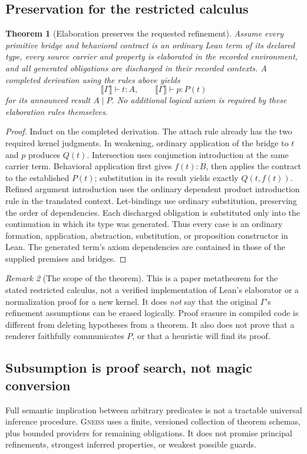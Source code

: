 \documentclass[11pt,letterpaper]{article}
\newcommand{\Gneiss}{\textsc{Gneiss}}
\newcommand{\sem}[1]{\llbracket #1\rrbracket}
\newtheorem{theorem}{Theorem}[section]
\theoremstyle{definition}
\theoremstyle{remark}
\newtheorem{remark}[theorem]{Remark}
\begin{document}
\subsection{Preservation for the restricted calculus}
\begin{theorem}[Elaboration preserves the requested refinement]\label{thm:preservation}
Assume every primitive bridge and behavioral contract is an ordinary Lean term
of its declared type, every source carrier and property is elaborated in the
recorded environment, and all generated obligations are discharged in their
recorded contexts. A completed derivation using the rules above yields
\[
 \sem\Gamma\vdash t:A,
 \qquad \sem\Gamma\vdash p:P(t)
\]
for its announced result $A\mid P$. No additional logical axiom is required by
these elaboration rules themselves.
\end{theorem}
\begin{proof}
Induct on the completed derivation. The attach rule already has the two required
kernel judgments. In weakening, ordinary application of the bridge to $t$ and
$p$ produces $Q(t)$. Intersection uses conjunction introduction at the same
carrier term. Behavioral application first gives $f(t):B$, then applies the
contract to the established $P(t)$; substitution in its result yields exactly
$Q(t,f(t))$. Refined argument introduction uses the ordinary dependent product
introduction rule in the translated context. Let-bindings use ordinary
substitution, preserving the order of dependencies. Each discharged obligation
is substituted only into the continuation in which its type was generated.
Thus every case is an ordinary formation, application, abstraction,
substitution, or proposition constructor in Lean. The generated term's axiom
dependencies are contained in those of the supplied premises and bridges.
\end{proof}

\begin{remark}[The scope of the theorem]
This is a paper metatheorem for the stated restricted calculus, not a verified
implementation of Lean's elaborator or a normalization proof for a new kernel.
It does \emph{not} say that the original $\Gamma$'s refinement assumptions can
be erased logically. Proof erasure in compiled code is different from deleting
hypotheses from a theorem. It also does not prove that a renderer faithfully
communicates $P$, or that a heuristic will find its proof.
\end{remark}

\subsection{Subsumption is proof search, not magic conversion}
Full semantic implication between arbitrary predicates is not a tractable
universal inference procedure. \Gneiss{} uses a finite, versioned collection
of theorem schemas, plus bounded providers for remaining obligations. It does
not promise principal refinements, strongest inferred properties, or weakest
possible guards.
\end{document}
